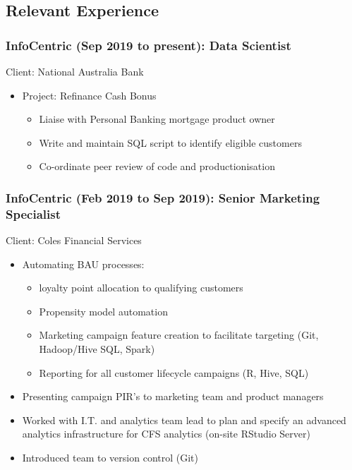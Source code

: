 \documentclass{article}
\begin{document}
\subsection{Relevant Experience}


\subsubsection{InfoCentric (Sep 2019 to present): Data Scientist}
Client: National Australia Bank
\begin{itemize}
    \item Project: Refinance Cash Bonus
        \begin{itemize}
            \item Liaise with Personal Banking mortgage product owner
            \item Write and maintain SQL script to identify eligible customers
            \item Co-ordinate peer review of code and productionisation
        \end{itemize}
\end{itemize}

\subsubsection{InfoCentric (Feb 2019 to Sep 2019): Senior Marketing Specialist}
Client: Coles Financial Services
\begin{itemize}
    \item Automating BAU processes:
        \begin{itemize}
            \item loyalty point allocation to qualifying customers
            \item Propensity model automation
            \item Marketing campaign feature creation to facilitate targeting (Git, Hadoop/Hive SQL, Spark)
            \item Reporting for all customer lifecycle campaigns (R, Hive, SQL)
        \end{itemize}
    \item Presenting campaign PIR’s to marketing team and product managers
    \item Worked with I.T. and analytics team lead to plan and specify an advanced analytics infrastructure for CFS analytics (on-site RStudio Server)
    \item Introduced team to version control (Git)
\end{itemize}
\end{document}

